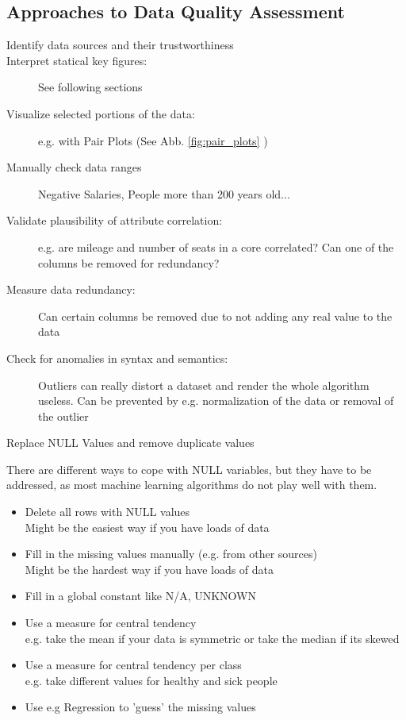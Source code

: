 \documentclass[a4paper, 11pt]{article}
\begin{document}
\subsection{Approaches to Data Quality Assessment}

\begin{description}
    \item[Identify data sources and their trustworthiness]
    \item[Interpret statical key figures: ] See following sections
    \item[Visualize selected portions of the data: ] e.g. with Pair Plots (See Abb. \ref{fig:pair_plots} )
    \item[Manually check data ranges] Negative Salaries, People more than 200 years old...
    \item[Validate plausibility of attribute correlation: ] e.g. are mileage and number of seats in a core correlated? Can one of the columns be removed for redundancy?
    \item[Measure data redundancy: ] Can certain columns be removed due to not adding any real value to the data
    \item[Check for anomalies in syntax and semantics: ] Outliers can really distort a dataset and render the whole algorithm useless. Can be prevented by e.g. normalization of the data or removal of the outlier
    \item[Replace NULL Values and remove duplicate values]
\end{description}

There are different ways to cope with NULL variables, but they have to be addressed, as most machine learning algorithms do not play well with them. 

\begin{itemize}
    \item Delete all rows with NULL values \\
        Might be the easiest way if you have loads of data
    \item Fill in the missing values manually (e.g. from other sources) \\
        Might be the hardest way if you have loads of data
    \item Fill in a global constant like N/A, UNKNOWN
    \item Use a measure for central tendency \\
        e.g. take the mean if your data is symmetric or take the median if its skewed
    \item Use a measure for central tendency per class \\
        e.g. take different values for healthy and sick people
    \item Use e.g Regression to 'guess' the missing values
\end{itemize}
\end{document}
